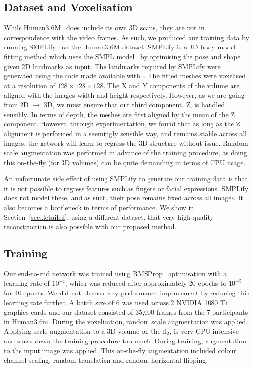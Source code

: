 \subsection{Dataset and Voxelisation}

While Human3.6M~\cite{IonescuSminchisescu11,h36m_pami} does include
its own 3D scans, they are not in correspondence with the video
frames. As such, we produced our training data by running
SMPLify~\cite{bogo2016smplify} on the Human3.6M dataset. SMPLify is a
3D body model fitting method which uses the SMPL
model~\cite{loper2015smpl} by optimising the pose and shape given 2D
landmarks as input. The landmarks required by SMPLify were generated
using the code made available with~\cite{bulat2016human}. The fitted
meshes were voxelised at a resolution of $128\times 128 \times
128$. The X and Y components of the volume are aligned with the images
width and height respectively. However, as we are going from 2D
$\rightarrow$ 3D, we must ensure that our third component, Z, is
handled sensibly. In terms of depth, the meshes are first aligned by
the mean of the Z component. However, through experimentation, we
found that as long as the Z alignment is performed in a seemingly
sensible way, and remains stable across all images, the network will
learn to regress the 3D structure without issue. Random scale
augmentation was performed in advance of the training procedure, as
doing this on-the-fly (for 3D volumes) can be quite demanding in terms
of CPU usage.

An unfortunate side effect of using SMPLify to generate our training
data is that it is not possible to regress features such as fingers or
facial expressions. SMPLify does not model these, and as such, their
pose remains fixed across all images. It also becomes a bottleneck in
terms of performance. We show in Section~\ref{sec:detailed}, using a
different dataset, that very high quality reconstruction is also
possible with our proposed method.


\subsection{Training}

Our end-to-end network was trained using
RMSProp~\cite{hinton2012neural} optimisation with a learning rate of
$10^{-4}$, which was reduced after approximately 20 epochs to
$10^{-5}$ for 40 epochs. We did not observe any performance
improvement by reducing this learning rate further. A batch size of 6
was used across 2 NVIDIA 1080 Ti graphics cards and our dataset
consisted of 35,000 frames from the 7 participants in Human3.6m.
During the voxelisation, random scale augmentation was
applied. Applying scale augmentation to a 3D volume on the fly, is
very CPU intensive and slows down the training procedure too
much. During training, augmentation to the input image was
applied. This on-the-fly augmentation included colour channel scaling,
random translation and random horizontal flipping.


